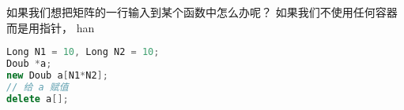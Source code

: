 
如果我们想把矩阵的一行输入到某个函数中怎么办呢？ 如果我们不使用任何容器而是用指针， han
\begin{lstlisting}[language=cpp]
Long N1 = 10, Long N2 = 10;
Doub *a;
new Doub a[N1*N2];
// 给 a 赋值
delete a[];
\end{lstlisting}
